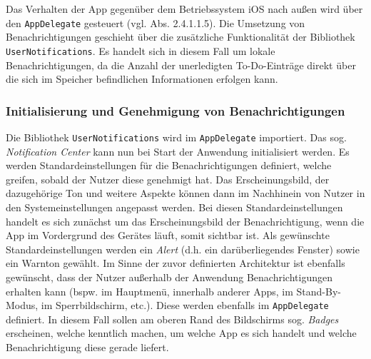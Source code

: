Das Verhalten der App gegenüber dem Betriebssystem iOS nach außen wird über den \texttt{AppDelegate} gesteuert (vgl. Abs. 2.4.1.1.5). Die Umsetzung von Benachrichtigungen geschieht über die zusätzliche Funktionalität der Bibliothek \texttt{UserNotifications}. Es handelt sich in diesem Fall um lokale Benachrichtigungen, da die Anzahl der unerledigten To-Do-Einträge direkt über die sich im Speicher befindlichen Informationen erfolgen kann.

\subsubsection{Initialisierung und Genehmigung von Benachrichtigungen}
Die Bibliothek \texttt{UserNotifications} wird im \texttt{AppDelegate} importiert. Das sog. \textit{Notification Center} kann nun bei Start der Anwendung initialisiert werden. Es werden Standardeinstellungen für die Benachrichtigungen definiert, welche greifen, sobald der Nutzer diese genehmigt hat. Das Erscheinungsbild, der dazugehörige Ton und weitere Aspekte können dann im Nachhinein von Nutzer in den Systemeinstellungen angepasst werden. Bei diesen Standardeinstellungen handelt es sich zunächst um das Erscheinungsbild der Benachrichtigung, wenn die App im Vordergrund des Gerätes läuft, somit sichtbar ist. Als gewünschte Standardeinstellungen werden ein \textit{Alert} (d.h. ein darüberliegendes Fenster) sowie ein Warnton gewählt. Im Sinne der zuvor definierten Architektur ist ebenfalls gewünscht, dass der Nutzer außerhalb der Anwendung Benachrichtigungen erhalten kann (bspw. im Hauptmenü, innerhalb anderer Apps, im Stand-By-Modus, im Sperrbildschirm, etc.). Diese werden ebenfalls im \texttt{AppDelegate} definiert. In diesem Fall sollen am oberen Rand des Bildschirms sog. \textit{Badges} erscheinen, welche kenntlich machen, um welche App es sich handelt und welche Benachrichtigung diese gerade liefert.

